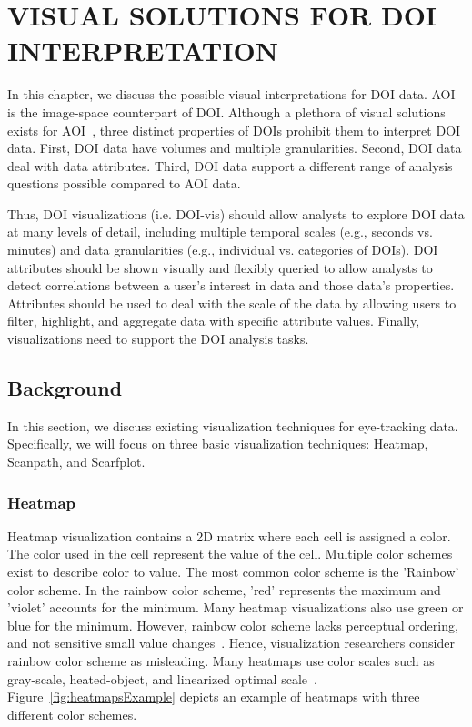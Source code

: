\chapter{VISUAL SOLUTIONS FOR DOI INTERPRETATION}
\label{chap:DOIVis}
In this chapter, we discuss the possible visual interpretations for DOI data. AOI is the image-space counterpart of DOI. Although a plethora of visual solutions exists for AOI~\cite{Bla14}, three distinct properties of DOIs prohibit them to interpret DOI data. First, DOI data have volumes and multiple granularities. Second, DOI data deal with data attributes. Third, DOI data support a different range of analysis questions possible compared to AOI data. 

Thus, DOI visualizations (i.e. DOI-vis) should allow analysts to explore DOI data at many levels of detail, including multiple temporal scales (e.g., seconds vs. minutes) and data granularities (e.g., individual vs. categories of DOIs).  DOI attributes should be shown visually and flexibly queried to allow analysts to detect correlations between a user's interest in data and those data's properties. Attributes should be used to deal with the scale of the data by allowing users to filter, highlight, and aggregate data with specific attribute values. Finally, visualizations need to support the DOI analysis tasks. 



\section{Background}
\label{sec:ClassicVisualization}
In this section, we discuss existing visualization techniques for eye-tracking data. Specifically, we will focus on three basic visualization techniques: Heatmap, Scanpath, and Scarfplot. %

\subsection{Heatmap}
Heatmap visualization contains a 2D matrix where each cell is assigned a color. The color used in the cell represent the value of the cell. Multiple color schemes exist to describe color to value. The most common color scheme is the 'Rainbow' color scheme. In the rainbow color scheme, 'red' represents the maximum and 'violet' accounts for the minimum. Many heatmap visualizations also use green or blue for the minimum. However, rainbow color scheme lacks perceptual ordering, and not sensitive small value changes~\cite{borland2007rainbow}. Hence, visualization researchers consider rainbow color scheme as misleading. Many heatmaps use color scales such as gray-scale, heated-object, and linearized optimal scale~\cite{silva2007there}. Figure~\ref{fig:heatmapsExample} depicts an example of heatmaps with three different color schemes. 

